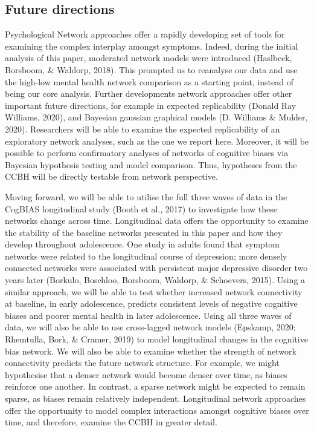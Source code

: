 \documentclass[
  english,
  man]{apa6}
\begin{document}
\hypertarget{future-directions}{%
\subsection{Future directions}\label{future-directions}}

Psychological Network approaches offer a rapidly developing set of tools for examining the complex interplay amongst symptoms. Indeed, during the initial analysis of this paper, moderated network models were introduced (Haslbeck, Borsboom, \& Waldorp, 2018). This prompted us to reanalyse our data and use the high-low mental health network comparison as a starting point, instead of being our core analysis. Further developments network approaches offer other important future directions, for example in expected replicability (Donald Ray Williams, 2020), and Bayesian gaussian graphical models (D. Williams \& Mulder, 2020). Researchers will be able to examine the expected replicability of an exploratory network analyses, such as the one we report here. Moreover, it will be possible to perform confirmatory analyses of networks of cognitive biases via Bayesian hypothesis testing and model comparison. Thus, hypotheses from the CCBH will be directly testable from network perspective.

Moving forward, we will be able to utilise the full three waves of data in the CogBIAS longitudinal study (Booth et al., 2017) to investigate how these networks change across time. Longitudinal data offers the opportunity to examine the stability of the baseline networks presented in this paper and how they develop throughout adolescence. One study in adults found that symptom networks were related to the longitudinal course of depression; more densely connected networks were associated with persistent major depressive disorder two years later (Borkulo, Boschloo, Borsboom, Waldorp, \& Schoevers, 2015). Using a similar approach, we will be able to test whether increased network connectivity at baseline, in early adolescence, predicts consistent levels of negative cognitive biases and poorer mental health in later adolescence. Using all three waves of data, we will also be able to use cross-lagged network models (Epskamp, 2020; Rhemtulla, Bork, \& Cramer, 2019) to model longitudinal changes in the cognitive bias network. We will also be able to examine whether the strength of network connectivity predicts the future network structure. For example, we might hypothesise that a denser network would become denser over time, as biases reinforce one another. In contrast, a sparse network might be expected to remain sparse, as biases remain relatively independent. Longitudinal network approaches offer the opportunity to model complex interactions amongst cognitive biases over time, and therefore, examine the CCBH in greater detail.
\end{document}
